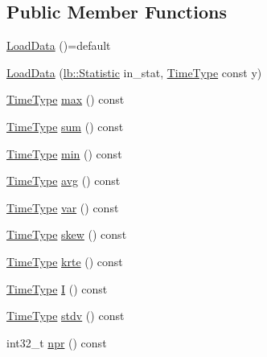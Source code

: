 \subsection*{Public Member Functions}
\begin{DoxyCompactItemize}
\item 
\hyperlink{structvt_1_1vrt_1_1collection_1_1balance_1_1_load_data_afc2d1f780b2a168ec80f0cf28c830847}{Load\+Data} ()=default
\item 
\hyperlink{structvt_1_1vrt_1_1collection_1_1balance_1_1_load_data_ad9149ba5edc39bfa03819c6ae66a07ff}{Load\+Data} (\hyperlink{namespacevt_1_1vrt_1_1collection_1_1lb_af0e20ef9afee77295053aa83bf1348b1}{lb\+::\+Statistic} in\+\_\+stat, \hyperlink{namespacevt_a876a9d0cd5a952859c72de8a46881442}{Time\+Type} const y)
\item 
\hyperlink{namespacevt_a876a9d0cd5a952859c72de8a46881442}{Time\+Type} \hyperlink{structvt_1_1vrt_1_1collection_1_1balance_1_1_load_data_a5b1b307477ac122e6df08f28ecf6bb71}{max} () const
\item 
\hyperlink{namespacevt_a876a9d0cd5a952859c72de8a46881442}{Time\+Type} \hyperlink{structvt_1_1vrt_1_1collection_1_1balance_1_1_load_data_a1c941d76f28ff10dd78a55553f9b58ce}{sum} () const
\item 
\hyperlink{namespacevt_a876a9d0cd5a952859c72de8a46881442}{Time\+Type} \hyperlink{structvt_1_1vrt_1_1collection_1_1balance_1_1_load_data_a3a4fc0cb3206cb552e83ef1caa8975eb}{min} () const
\item 
\hyperlink{namespacevt_a876a9d0cd5a952859c72de8a46881442}{Time\+Type} \hyperlink{structvt_1_1vrt_1_1collection_1_1balance_1_1_load_data_ac486f8036d3af52bc5879170ff221046}{avg} () const
\item 
\hyperlink{namespacevt_a876a9d0cd5a952859c72de8a46881442}{Time\+Type} \hyperlink{structvt_1_1vrt_1_1collection_1_1balance_1_1_load_data_ad3008ba8640803abb1a22b37c4224781}{var} () const
\item 
\hyperlink{namespacevt_a876a9d0cd5a952859c72de8a46881442}{Time\+Type} \hyperlink{structvt_1_1vrt_1_1collection_1_1balance_1_1_load_data_a4b32171c4432454889ad11e611e6e705}{skew} () const
\item 
\hyperlink{namespacevt_a876a9d0cd5a952859c72de8a46881442}{Time\+Type} \hyperlink{structvt_1_1vrt_1_1collection_1_1balance_1_1_load_data_a01ab8ead157e42fa39ac1ab19ab109c0}{krte} () const
\item 
\hyperlink{namespacevt_a876a9d0cd5a952859c72de8a46881442}{Time\+Type} \hyperlink{structvt_1_1vrt_1_1collection_1_1balance_1_1_load_data_aa5715f66445228e6d7961987443b0e68}{I} () const
\item 
\hyperlink{namespacevt_a876a9d0cd5a952859c72de8a46881442}{Time\+Type} \hyperlink{structvt_1_1vrt_1_1collection_1_1balance_1_1_load_data_accad5fedd41c42f6d0d7f94ee78d97b1}{stdv} () const
\item 
int32\+\_\+t \hyperlink{structvt_1_1vrt_1_1collection_1_1balance_1_1_load_data_a177178abc3a99dbbe51c5873e86f1ada}{npr} () const
\end{DoxyCompactItemize}
